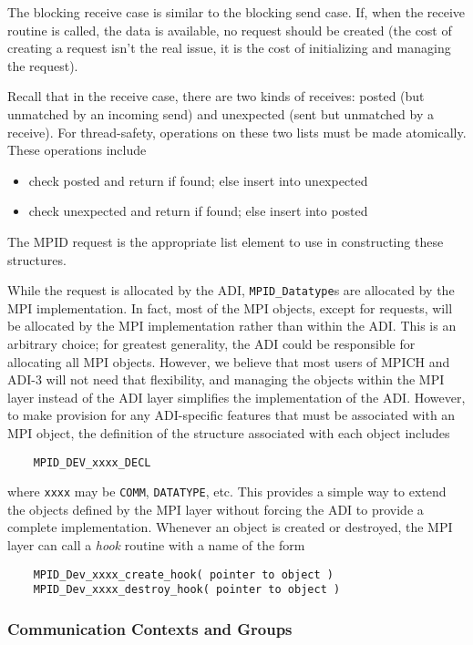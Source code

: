 \documentclass{article}
\def\code#1{\texttt{#1}}
\begin{document}
The blocking receive case is similar to the blocking send case.  If,
when the receive routine is called, the data is available, no request
should be created (the cost of creating a request isn't the real
issue, it is the cost of initializing and managing the request).  

Recall
that in the receive case, there are two kinds of receives: posted (but
unmatched by an incoming send) and unexpected (sent but unmatched by a
receive).  For thread-safety, operations on these two lists must be
made atomically.  These operations include 
\begin{itemize}
\item check posted and return if found; else insert into unexpected 
\item check unexpected and return if found; else insert into posted
\end{itemize}
The MPID request is the appropriate list element to use in
constructing these structures.

While the request is allocated by the ADI, \code{MPID_Datatype}s are
allocated by the MPI implementation.  In fact, most of the MPI
objects, except for requests, will be allocated by the MPI
implementation rather than within the ADI.  This is an arbitrary
choice; for greatest generality, the ADI could be responsible for
allocating all MPI objects.  However, we believe that most users of
MPICH and ADI-3 will not need that flexibility, and managing the
objects within the MPI layer instead of the ADI layer simplifies the
implementation of the ADI.  However, to make provision for any
ADI-specific features that must be associated with an MPI object, the
definition of the structure associated with each object includes
\begin{verbatim}
    MPID_DEV_xxxx_DECL
\end{verbatim}
where \code{xxxx} may be \code{COMM}, \code{DATATYPE}, etc.  This
provides a simple way to extend the objects defined by the MPI layer
without forcing the ADI to provide a complete implementation.
Whenever an object is created or destroyed, the MPI layer can call a
\emph{hook} routine with a name of the form
\begin{verbatim}
    MPID_Dev_xxxx_create_hook( pointer to object )
    MPID_Dev_xxxx_destroy_hook( pointer to object )
\end{verbatim}

\subsubsection{Communication Contexts and Groups}
\end{document}
